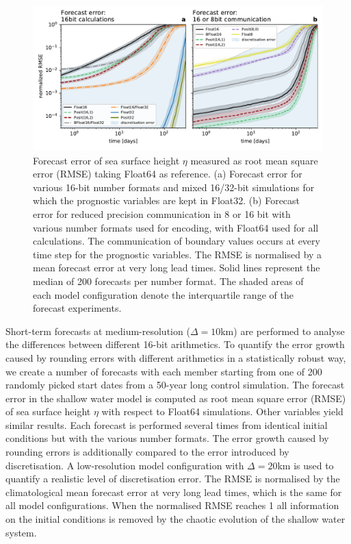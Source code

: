 \begin{figure}
\includegraphics[width=1\textwidth]{Figures/swm/rmse_eta_darker.pdf}
\caption{Forecast error of sea surface height $\eta$ measured as root mean square
error (RMSE) taking Float64 as reference. (a) Forecast error for various 16-bit
number formats and mixed 16/32-bit simulations for which the prognostic variables
are kept in Float32. (b) Forecast error for reduced precision communication in
8 or 16 bit with various number formats used for encoding, with Float64 used for
all calculations. The communication of boundary values occurs at every time step
for the prognostic variables. The RMSE is normalised by a mean forecast error at
very long lead times. Solid lines represent the median of 200 forecasts per number
format. The shaded areas of each model configuration denote the interquartile
range of the forecast experiments.}
\label{fig:rmse}
\end{figure}

Short-term forecasts at medium-resolution ($\Delta = 10$km) are performed to
analyse the differences between different 16-bit arithmetics. To quantify the error
growth caused by rounding errors with different arithmetics in a statistically
robust way, we create a number of forecasts with each member starting from one
of 200 randomly picked start dates from a 50-year long control simulation. The
forecast error in the shallow water model is computed as root mean square error
(RMSE) of sea surface height $\eta$ with respect to Float64 simulations. Other
variables yield similar results. Each forecast is performed several times from
identical initial conditions but with the various number formats. The error growth
caused by rounding errors is additionally compared to the error
introduced by discretisation. A low-resolution model configuration with
$\Delta = 20$km is used to quantify a realistic level of discretisation error.
The RMSE is normalised by the climatological mean forecast error at very long lead
times, which is the same for all model configurations. When the normalised RMSE
reaches 1 all information on the initial conditions is removed by the chaotic
evolution of the shallow water system.

